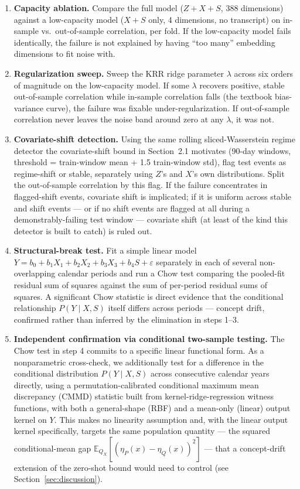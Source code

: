 \documentclass[11pt]{article}
\begin{document}
\begin{enumerate}
  \item \textbf{Capacity ablation.} Compare the full model ($Z+X+S$, 388 dimensions) against a low-capacity model ($X+S$ only, 4 dimensions, no transcript) on in-sample vs.\ out-of-sample correlation, per fold. If the low-capacity model fails identically, the failure is not explained by having ``too many'' embedding dimensions to fit noise with.
  \item \textbf{Regularization sweep.} Sweep the KRR ridge parameter $\lambda$ across six orders of magnitude on the low-capacity model. If some $\lambda$ recovers positive, stable out-of-sample correlation while in-sample correlation falls (the textbook bias-variance curve), the failure was fixable under-regularization. If out-of-sample correlation never leaves the noise band around zero at any $\lambda$, it was not.
  \item \textbf{Covariate-shift detection.} Using the same rolling sliced-Wasserstein regime detector the covariate-shift bound in Section~2.1 motivates (90-day windows, threshold = train-window mean + 1.5 train-window std), flag test events as regime-shift or stable, separately using $Z$'s and $X$'s own distributions. Split the out-of-sample correlation by this flag. If the failure concentrates in flagged-shift events, covariate shift is implicated; if it is uniform across stable and shift events --- or if no shift events are flagged at all during a demonstrably-failing test window --- covariate shift (at least of the kind this detector is built to catch) is ruled out.
  \item \textbf{Structural-break test.} Fit a simple linear model $Y = b_0 + b_1 X_1 + b_2 X_2 + b_3 X_3 + b_4 S + \varepsilon$ separately in each of several non-overlapping calendar periods and run a Chow test \citep{chow1960tests} comparing the pooled-fit residual sum of squares against the sum of per-period residual sums of squares. A significant Chow statistic is direct evidence that the conditional relationship $P(Y\mid X,S)$ itself differs across periods --- concept drift, confirmed rather than inferred by the elimination in steps 1--3.
  \item \textbf{Independent confirmation via conditional two-sample testing.} The Chow test in step 4 commits to a specific linear functional form. As a nonparametric cross-check, we additionally test for a difference in the conditional distribution $P(Y\mid X,S)$ across consecutive calendar years directly, using a permutation-calibrated conditional maximum mean discrepancy (CMMD) statistic \citep{massiani2025kernel} built from kernel-ridge-regression witness functions, with both a general-shape (RBF) and a mean-only (linear) output kernel on $Y$. This makes no linearity assumption and, with the linear output kernel specifically, targets the same population quantity --- the squared conditional-mean gap $\mathbb{E}_{Q_X}[(\eta_P(x)-\eta_Q(x))^2]$ --- that a concept-drift extension of the zero-shot bound would need to control (see Section~\ref{sec:discussion}).
\end{enumerate}
\end{document}
